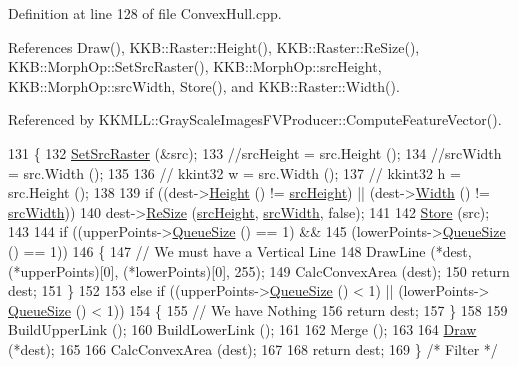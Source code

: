 Definition at line 128 of file Convex\+Hull.\+cpp.



References Draw(), K\+K\+B\+::\+Raster\+::\+Height(), K\+K\+B\+::\+Raster\+::\+Re\+Size(), K\+K\+B\+::\+Morph\+Op\+::\+Set\+Src\+Raster(), K\+K\+B\+::\+Morph\+Op\+::src\+Height, K\+K\+B\+::\+Morph\+Op\+::src\+Width, Store(), and K\+K\+B\+::\+Raster\+::\+Width().



Referenced by K\+K\+M\+L\+L\+::\+Gray\+Scale\+Images\+F\+V\+Producer\+::\+Compute\+Feature\+Vector().


\begin{DoxyCode}
131 \{
132   \hyperlink{class_k_k_b_1_1_morph_op_a07c75e151d9b95ca13da3bfc2e48dba4}{SetSrcRaster} (&src);
133   \textcolor{comment}{//srcHeight = src.Height ();}
134   \textcolor{comment}{//srcWidth  = src.Width  ();}
135 
136 \textcolor{comment}{//  kkint32 w = src.Width ();}
137 \textcolor{comment}{//  kkint32 h = src.Height ();}
138 
139   \textcolor{keywordflow}{if}  ((dest->\hyperlink{class_k_k_b_1_1_raster_af8d10d15697d5b92fb9595c48b529feb}{Height} () != \hyperlink{class_k_k_b_1_1_morph_op_a54b2ce1b398a80803b4dbe8aef956b51}{srcHeight})  ||  (dest->\hyperlink{class_k_k_b_1_1_raster_aa2780c0b7ae75b7b595f99329689c1f6}{Width} () != 
      \hyperlink{class_k_k_b_1_1_morph_op_aec2cfb3015497e4077751fc5f19559ab}{srcWidth}))
140     dest->\hyperlink{class_k_k_b_1_1_raster_ad0a4daf2ba175cedf00ce975bb746417}{ReSize} (\hyperlink{class_k_k_b_1_1_morph_op_a54b2ce1b398a80803b4dbe8aef956b51}{srcHeight}, \hyperlink{class_k_k_b_1_1_morph_op_aec2cfb3015497e4077751fc5f19559ab}{srcWidth}, \textcolor{keyword}{false});
141         
142   \hyperlink{class_k_k_b_1_1_convex_hull_a055ea906fe75fd90e6b3a12bdad02c5b}{Store} (src);
143 
144   \textcolor{keywordflow}{if}  ((upperPoints->\hyperlink{class_k_k_b_1_1_k_k_queue_a1dab601f75ee6a65d97f02bddf71c40d}{QueueSize} () == 1)  &&  
145        (lowerPoints->\hyperlink{class_k_k_b_1_1_k_k_queue_a1dab601f75ee6a65d97f02bddf71c40d}{QueueSize} () == 1))
146   \{
147     \textcolor{comment}{// We must have a Vertical  Line}
148     DrawLine (*dest, (*upperPoints)[0], (*lowerPoints)[0], 255);
149     CalcConvexArea (dest);
150     \textcolor{keywordflow}{return}  dest;
151   \}
152 
153   \textcolor{keywordflow}{else} \textcolor{keywordflow}{if}  ((upperPoints->\hyperlink{class_k_k_b_1_1_k_k_queue_a1dab601f75ee6a65d97f02bddf71c40d}{QueueSize} () < 1)  ||  (lowerPoints->
      \hyperlink{class_k_k_b_1_1_k_k_queue_a1dab601f75ee6a65d97f02bddf71c40d}{QueueSize} () < 1))
154   \{
155     \textcolor{comment}{// We have Nothing}
156     \textcolor{keywordflow}{return} dest;
157   \}
158 
159   BuildUpperLink ();
160   BuildLowerLink ();
161 
162   Merge ();
163 
164   \hyperlink{class_k_k_b_1_1_convex_hull_a89c8dc3b365746771bfd92475fa18bd9}{Draw} (*dest);
165   
166   CalcConvexArea (dest);
167 
168   \textcolor{keywordflow}{return} dest;
169 \}  \textcolor{comment}{/* Filter */}
\end{DoxyCode}

